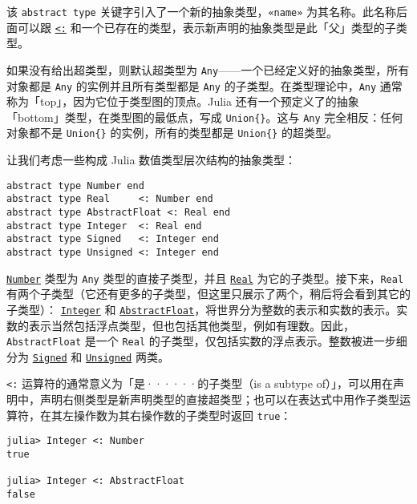 该 \texttt{abstract type} 关键字引入了一个新的抽象类型，\texttt{«name»} 为其名称。此名称后面可以跟 \hyperlink{6254591906563366276}{\texttt{<:}} 和一个已存在的类型，表示新声明的抽象类型是此「父」类型的子类型。



如果没有给出超类型，则默认超类型为 \texttt{Any}——一个已经定义好的抽象类型，所有对象都是 \texttt{Any} 的实例并且所有类型都是 \texttt{Any} 的子类型。在类型理论中，\texttt{Any} 通常称为「top」，因为它位于类型图的顶点。Julia 还有一个预定义了的抽象「bottom」类型，在类型图的最低点，写成 \texttt{Union\{\}}。这与 \texttt{Any} 完全相反：任何对象都不是 \texttt{Union\{\}} 的实例，所有的类型都是 \texttt{Union\{\}} 的超类型。



让我们考虑一些构成 Julia 数值类型层次结构的抽象类型：




\begin{verbatim}
abstract type Number end
abstract type Real     <: Number end
abstract type AbstractFloat <: Real end
abstract type Integer  <: Real end
abstract type Signed   <: Integer end
abstract type Unsigned <: Integer end
\end{verbatim}



\hyperlink{1990584313715697055}{\texttt{Number}} 类型为 \texttt{Any} 类型的直接子类型，并且 \hyperlink{6175959395021454412}{\texttt{Real}} 为它的子类型。接下来，\texttt{Real} 有两个子类型（它还有更多的子类型，但这里只展示了两个，稍后将会看到其它的子类型）： \hyperlink{8469131683393450448}{\texttt{Integer}} 和 \hyperlink{11465394427882483091}{\texttt{AbstractFloat}}，将世界分为整数的表示和实数的表示。实数的表示当然包括浮点类型，但也包括其他类型，例如有理数。因此，\texttt{AbstractFloat} 是一个 \texttt{Real} 的子类型，仅包括实数的浮点表示。整数被进一步细分为 \hyperlink{14154866400772377486}{\texttt{Signed}} 和 \hyperlink{4780971278803506664}{\texttt{Unsigned}} 两类。



\texttt{<:} 运算符的通常意义为「是······的子类型（is a subtype of）」，可以用在声明中，声明右侧类型是新声明类型的直接超类型；也可以在表达式中用作子类型运算符，在其左操作数为其右操作数的子类型时返回 \texttt{true}：




\begin{verbatim}
julia> Integer <: Number
true

julia> Integer <: AbstractFloat
false
\end{verbatim}



